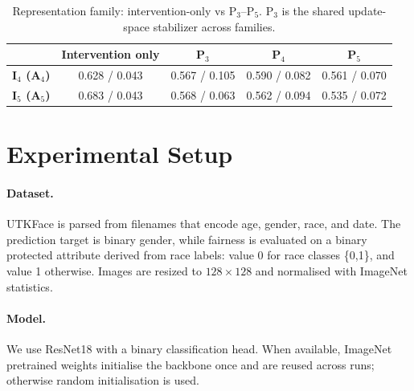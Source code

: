﻿\documentclass{article}
\begin{document}
\begin{table}[ht!]
  \caption{Representation family: intervention-only vs P$_3$--P$_5$.
  P$_3$ is the shared update-space stabilizer across families.}
  \label{tab:admatrix_repr}
  \centering
  \small
  \setlength{\tabcolsep}{5pt}
  \begin{tabular}{lcccc}
    \toprule
    & \textbf{Intervention only} & \textbf{P$_3$} & \textbf{P$_4$} & \textbf{P$_5$} \\
    \midrule
    \textbf{I$_4$ (A$_4$)} & 0.628 / 0.043 & 0.567 / 0.105 & 0.590 / 0.082 & 0.561 / 0.070 \\
    \textbf{I$_5$ (A$_5$)} & 0.683 / 0.043 & 0.568 / 0.063 & 0.562 / 0.094 & 0.535 / 0.072 \\
    \bottomrule
  \end{tabular}
\end{table}

\section{Experimental Setup}
\label{sec:experiments}

\paragraph{Dataset.}
UTKFace is parsed from filenames that encode
age, gender, race, and date.
The prediction target is binary gender, while fairness is evaluated on
a binary protected attribute derived from race labels:
value 0 for race classes \{0,1\}, and value 1 otherwise.
Images are resized to $128\times128$ and normalised with ImageNet
statistics.

\paragraph{Model.}
We use ResNet18 with a binary classification head.
When available, ImageNet pretrained weights initialise the backbone
once and are reused across runs; otherwise random initialisation is
used.
\end{document}
